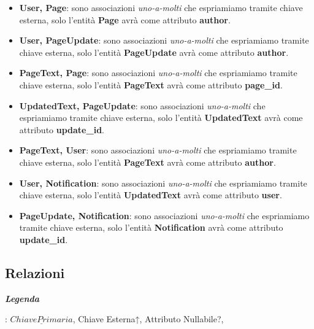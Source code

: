\documentclass{article}
\begin{document}
{	
		\begin{itemize}
		\item \textbf{User, Page}: sono associazioni {\itshape{uno-a-molti}} che espriamiamo tramite chiave esterna, solo l'entit\`a \textbf{Page} avr\`a come attributo \textbf{author}.
		\item \textbf{User, PageUpdate}: sono associazioni {\itshape{uno-a-molti}} che espriamiamo tramite chiave esterna, solo l'entit\`a \textbf{PageUpdate} avr\`a come attributo \textbf{author}.
		\item \textbf{PageText, Page}: sono associazioni {\itshape{uno-a-molti}} che espriamiamo tramite chiave esterna, solo l'entit\`a \textbf{PageText} avr\`a come attributo \textbf{page\_id}.
		\item \textbf{UpdatedText, PageUpdate}: sono associazioni {\itshape{uno-a-molti}} che espriamiamo tramite chiave esterna, solo l'entit\`a \textbf{UpdatedText} avr\`a come attributo \textbf{update\_id}.
		\item \textbf{PageText, User}: sono associazioni {\itshape{uno-a-molti}} che espriamiamo tramite chiave esterna, solo l'entit\`a \textbf{PageText} avr\`a come attributo \textbf{author}.
		\item \textbf{User, Notification}: sono associazioni {\itshape{uno-a-molti}} che espriamiamo tramite chiave esterna, solo l'entit\`a \textbf{UpdatedText} avr\`a come attributo \textbf{user}.
		\item \textbf{PageUpdate, Notification}: sono associazioni {\itshape{uno-a-molti}} che espriamiamo tramite chiave esterna, solo l'entit\`a \textbf{Notification} avr\`a come attributo \textbf{update\_id}.
	\end{itemize}
	
	\subsection{Relazioni}
	\textbf{{\itshape{Legenda}}}}: $\underline{Chiave Primaria}$, Chiave Esterna↑, Attributo Nullabile?, 
	
\end{document}
